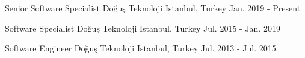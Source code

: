 

\begin{cventries}

  \cventry
    {Senior Software Specialist} %
    {Doğuş Teknoloji} %
    {Istanbul, Turkey} %
    {Jan. 2019 - Present} %
    {}

  \cventry
    {Software Specialist} %
    {Doğuş Teknoloji} %
    {Istanbul, Turkey} %
    {Jul. 2015 - Jan. 2019} %
    {}

  \cventry
    {Software Engineer} %
    {Doğuş Teknoloji} %
    {Istanbul, Turkey} %
    {Jul. 2013 - Jul. 2015} %
    {}

\end{cventries}
